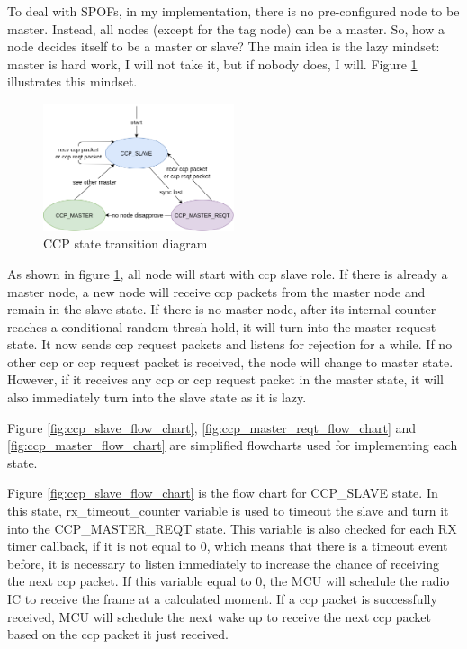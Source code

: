 \documentclass[\main/main.tex]{subfiles}
\begin{document}
To deal with SPOFs, in my implementation, there is no pre-configured node to be master. Instead, all nodes (except for the tag node) can be a master. So, how a node decides itself to be a master or slave? The main idea is the lazy mindset: master is hard work, I will not take it, but if nobody does, I will. Figure \ref{fig:CCP_state_diagram} illustrates this mindset.

\begin{figure}[H]
    \begin{center}
        \includegraphics[width=0.5\textwidth]{ccp_state_diagram.png}
    \end{center}
    \caption{CCP state transition diagram}
    \label{fig:CCP_state_diagram}
\end{figure}

As shown in figure \ref{fig:CCP_state_diagram}, all node will start with ccp slave role. If there is already a master node, a new node will receive ccp packets from the master node and remain in the slave state. If there is no master node, after its internal counter reaches a conditional random thresh hold, it will turn into the master request state. It now sends ccp request packets and listens for rejection for a while. If no other ccp or ccp request packet is received, the node will change to master state. However, if it receives any ccp or ccp request packet in the master state, it will also immediately turn into the slave state as it is lazy.

Figure \ref{fig:ccp_slave_flow_chart}, \ref{fig:ccp_master_reqt_flow_chart} and \ref{fig:ccp_master_flow_chart} are simplified flowcharts used for implementing each state.

Figure \ref{fig:ccp_slave_flow_chart} is the flow chart for CCP\_SLAVE state. In this state, rx\_timeout\_counter variable is used to timeout the slave and turn it into the CCP\_MASTER\_REQT state.
This variable is also checked for each RX timer callback, if it is not equal to 0, which means that there is a timeout event before, it is necessary to listen immediately to increase the chance of receiving the next ccp packet. If this variable equal to 0, the MCU will schedule the radio IC to receive the frame at a calculated moment. If a ccp packet is successfully received, MCU will schedule the next wake up to receive the next ccp packet based on the ccp packet it just received. 
\end{document}

